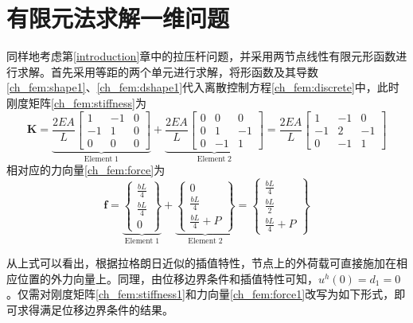 \section{有限元法求解一维问题}
同样地考虑第\ref{introduction}章中的拉压杆问题，并采用两节点线性有限元形函数进行求解。首先采用等距的两个单元进行求解，将形函数及其导数\eqref{ch_fem:shape1}、\eqref{ch_fem:dshape1}代入离散控制方程\eqref{ch_fem:discrete}中，此时刚度矩阵\eqref{ch_fem:stiffness}为
\begin{equation}\label{ch_fem:stiffness1}
\boldsymbol K =
\underbrace{
\frac{2EA}{L}
\begin{bmatrix}
        1 & -1 & 0 \\
        -1 & 1 & 0 \\
        0 & 0 & 0
\end{bmatrix}}_{\mathrm{Element\;1}} +
\underbrace{
\frac{2EA}{L}
\begin{bmatrix}
        0 & 0 & 0 \\
        0 & 1 & -1 \\
        0 & -1 & 1
\end{bmatrix}}_{\mathrm{Element\;2}}
= \frac{2EA}{L}
\begin{bmatrix}
        1 & -1 & 0 \\
        -1 & 2 & -1 \\
        0 & -1 & 1
\end{bmatrix}
\end{equation}
相对应的力向量\eqref{ch_fem:force}为
\begin{equation}\label{ch_fem:force1}
\boldsymbol f = 
\underbrace{
\begin{Bmatrix}
\frac{bL}{4} \\ \frac{bL}{4} \\ 0
\end{Bmatrix}}_{\mathrm{Element\;1}} +
\underbrace{
\begin{Bmatrix}
0 \\ \frac{bL}{4} \\ \frac{bL}{4} + P
\end{Bmatrix}}_{\mathrm{Element\;2}} =
\begin{Bmatrix}
\frac{bL}{4} \\ \frac{bL}{2} \\ \frac{bL}{4} + P
\end{Bmatrix}
\end{equation} \par
从上式可以看出，根据拉格朗日近似的插值特性，节点上的外荷载可直接施加在相应位置的外力向量上。同理，由位移边界条件和插值特性可知，$u^h(0)=d_1=0$。仅需对刚度矩阵\eqref{ch_fem:stiffness1}和力向量\eqref{ch_fem:force1}改写为如下形式，即可求得满足位移边界条件的结果。
